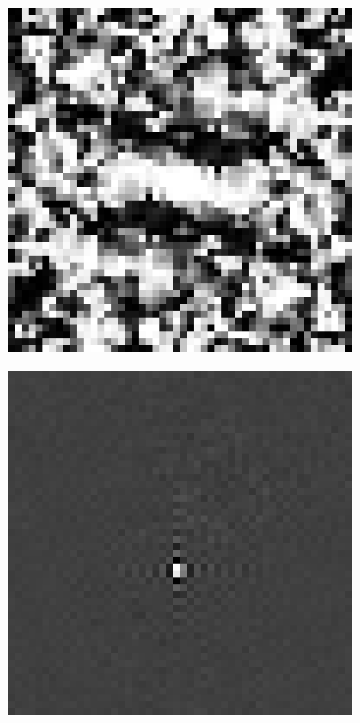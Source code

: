 \begin{figure}[htpb]
\begin{subfigure}{.25\textwidth}
\end{subfigure}%
\begin{subfigure}{.25\textwidth}
\includegraphics[width=1\textwidth]{img/CPSsigma300}
\end{subfigure}
\quad
\begin{subfigure}{.25\textwidth}
\includegraphics[width=1\textwidth]{img/noisyPOCsigma0}

\end{subfigure}
\end{figure}
